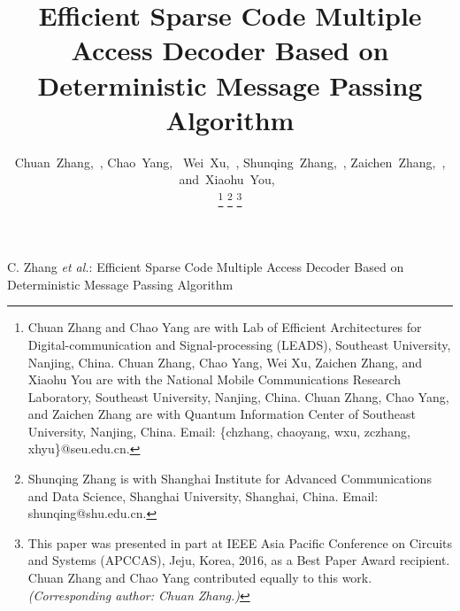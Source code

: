 \documentclass[journal,twoside]{IEEEtran}
\begin{document}
\newtheorem{myDef}{Definition}
\renewcommand{\algorithmicrequire}{\textbf{Input:}} %
\renewcommand{\algorithmicensure}{\textbf{Output:}} %
\newcommand{\minitab}[2][l]{\begin{tabular}{#1}#2\end{tabular}}

\title{Efficient Sparse Code Multiple Access Decoder Based on Deterministic Message Passing Algorithm}

\author{Chuan~Zhang,~,
        Chao~Yang,~%
        Wei~Xu,~,
        Shunqing~Zhang,~,
        Zaichen~Zhang,~,
        and~Xiaohu~You,~

\thanks{Chuan Zhang and Chao Yang are with Lab of Efficient Architectures for Digital-communication and Signal-processing (LEADS), Southeast University, Nanjing, China.
Chuan Zhang, Chao Yang, Wei Xu, Zaichen Zhang, and Xiaohu You are with the National Mobile Communications Research Laboratory, Southeast University, Nanjing, China.
Chuan Zhang, Chao Yang, and Zaichen Zhang are with Quantum Information Center of Southeast University, Nanjing, China. Email: \{chzhang, chaoyang, wxu, zczhang, xhyu\}@seu.edu.cn.}
\thanks{Shunqing Zhang is with Shanghai Institute for Advanced Communications and Data Science, Shanghai University, Shanghai, China. Email: shunqing@shu.edu.cn.}
\thanks{This paper was presented in part at IEEE Asia Pacific Conference on Circuits and Systems (APCCAS), Jeju, Korea, 2016, as a Best Paper Award recipient. Chuan Zhang and Chao Yang contributed equally to this work. \emph{(Corresponding author: Chuan Zhang.)}}
}

%
{C. Zhang \MakeLowercase{\textit{et al.}}: Efficient Sparse Code Multiple Access Decoder Based on Deterministic Message Passing Algorithm}
\end{document}
